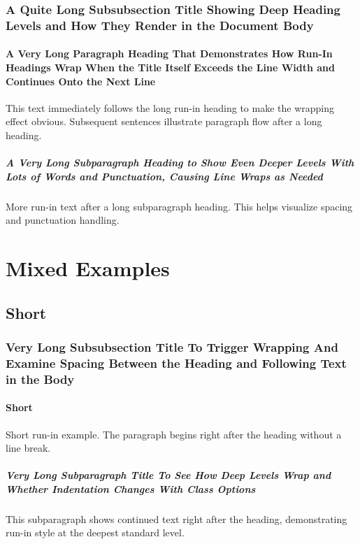 \subsubsection[Long subsubsection (short TOC)]{A Quite Long Subsubsection Title Showing Deep Heading Levels and How They Render in the Document Body}
\lipsum[8]

\paragraph[Long paragraph (short TOC)]{A Very Long Paragraph Heading That Demonstrates How Run-In Headings Wrap When the Title Itself Exceeds the Line Width and Continues Onto the Next Line} This text immediately follows the long run-in heading to make the wrapping effect obvious. Subsequent sentences illustrate paragraph flow after a long heading.

\subparagraph[Long subparagraph (short TOC)]{A Very Long Subparagraph Heading to Show Even Deeper Levels With Lots of Words and Punctuation, Causing Line Wraps as Needed} More run-in text after a long subparagraph heading. This helps visualize spacing and punctuation handling.

\section{Mixed Examples}
\lipsum[9]

\subsection{Short}
\lipsum[10]

\subsubsection{Very Long Subsubsection Title To Trigger Wrapping And Examine Spacing Between the Heading and Following Text in the Body}
\lipsum[11]

\paragraph{Short} Short run-in example. The paragraph begins right after the heading without a line break.

\subparagraph{Very Long Subparagraph Title To See How Deep Levels Wrap and Whether Indentation Changes With Class Options} This subparagraph shows continued text right after the heading, demonstrating run-in style at the deepest standard level.

